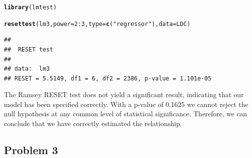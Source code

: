 \documentclass[12pt]{article}\usepackage[]{graphicx}\usepackage[]{color}
\makeatletter
\newcommand{\hlnum}[1]{\textcolor[rgb]{0.686,0.059,0.569}{#1}}%
\newcommand{\hlstr}[1]{\textcolor[rgb]{0.192,0.494,0.8}{#1}}%
\newcommand{\hlopt}[1]{\textcolor[rgb]{0,0,0}{#1}}%
\newcommand{\hlstd}[1]{\textcolor[rgb]{0.345,0.345,0.345}{#1}}%
\newcommand{\hlkwc}[1]{\textcolor[rgb]{0.333,0.667,0.333}{#1}}%
\newcommand{\hlkwd}[1]{\textcolor[rgb]{0.737,0.353,0.396}{\textbf{#1}}}%
\newenvironment{kframe}{%
 \def\at@end@of@kframe{}%
 \ifinner\ifhmode%
  \def\at@end@of@kframe{\end{minipage}}%
  \begin{minipage}{\columnwidth}%
 \fi\fi%
 \def\FrameCommand##1{\hskip\@totalleftmargin \hskip-\fboxsep
 \colorbox{shadecolor}{##1}\hskip-\fboxsep
     \hskip-\linewidth \hskip-\@totalleftmargin \hskip\columnwidth}%
 \MakeFramed {\advance\hsize-\width
   \@totalleftmargin\z@ \linewidth\hsize
   \@setminipage}}%
 {\par\unskip\endMakeFramed%
 \at@end@of@kframe}
\newenvironment{knitrout}{}{} %
\makeatother
\begin{document}
\begin{knitrout}
\color{fgcolor}\begin{kframe}
\begin{alltt}
\hlkwd{library}\hlstd{(lmtest)}
\end{alltt}


{\ttfamily\noindent\itshape\color{messagecolor}{\#\# Loading required package: zoo\\\#\# \\\#\# Attaching package: 'zoo'\\\#\# \\\#\# The following objects are masked from 'package:base':\\\#\# \\\#\#\ \ \ \  as.Date, as.Date.numeric}}\begin{alltt}
\hlkwd{resettest}\hlstd{(lm3,} \hlkwc{power} \hlstd{=} \hlnum{2}\hlopt{:}\hlnum{3}\hlstd{,} \hlkwc{type} \hlstd{=} \hlkwd{c}\hlstd{(}\hlstr{"regressor"}\hlstd{),} \hlkwc{data} \hlstd{= LDC)}
\end{alltt}
\begin{verbatim}
## 
## 	RESET test
## 
## data:  lm3
## RESET = 5.5149, df1 = 6, df2 = 2386, p-value = 1.101e-05
\end{verbatim}
\end{kframe}
\end{knitrout}

The Ramsey RESET test does not yield a significant result, indicating that our model has been specified correctly. With a p-value of 0.1625 we cannot reject the null hypothesis at any common level of statistical significance. Therefore, we can conclude that we have correctly estimated the relationship.



\subsection*{Problem 3}
\end{document}

